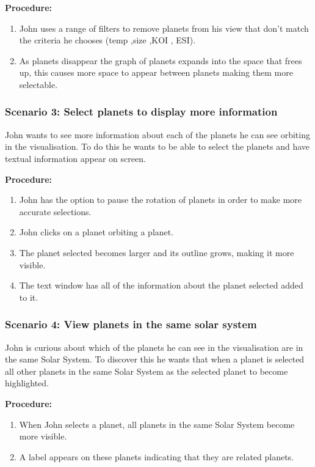   {\bf Procedure:}
  \begin{enumerate}
 \item John uses a range of filters to remove planets from his view that don't
match the criteria he chooses (temp ,size ,KOI , ESI).
\item As planets disappear the graph of planets expands into the space that
frees up, this causes more space to appear between planets making them more
selectable.
 \end{enumerate}
 
  \subsubsection{Scenario 3: Select planets to display more information}
 John wants to see more information about each of the planets he can see
orbiting in the visualisation. To do this he wants to be able to select the
planets and have textual information appear on screen.
 
  {\bf  Procedure:}
   \begin{enumerate}
 \item John has the option to pause the rotation of planets in order to make
more accurate selections. 
 \item John clicks on a planet orbiting a planet.
\item The planet selected becomes larger and its outline grows, making it more
visible.
\item The text window has all of the information about the planet selected added
to it.
 \end{enumerate}
 
 \subsubsection{Scenario 4: View planets in the same solar system}
John is curious about which of the planets he can see in the
visualisation are in the same Solar System. To discover this he wants that when
a planet is selected all other planets in the same Solar System as the selected
planet to become highlighted.
 
  {\bf  Procedure:}
   \begin{enumerate}
 \item When John selects a planet, all planets in the same Solar System become
more visible.
 \item A label appears on these planets indicating that they are related
planets.
 \end{enumerate}
 
